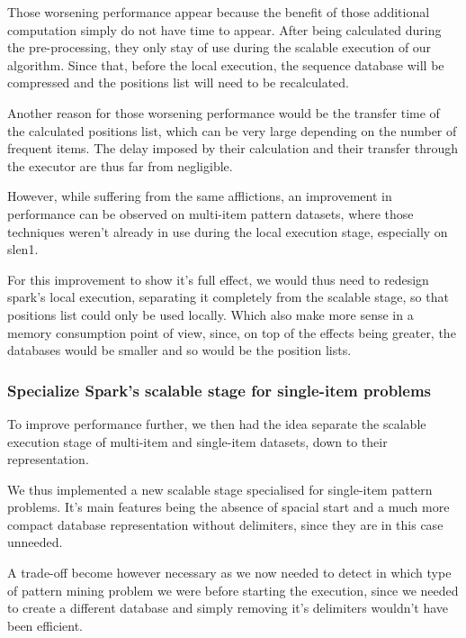 \documentclass{eplmastersthesis}
\begin{document}
Those worsening performance appear because the benefit of those additional computation simply do not have time to appear. After being calculated during the pre-processing, they only stay of use during the scalable execution of our algorithm. Since that, before the local execution, the sequence database will be compressed and the positions list will need to be recalculated. \newline

Another reason for those worsening performance would be the transfer time of the calculated positions list, which can be very large depending on the number of frequent items. The delay imposed by their calculation and their transfer through the executor are thus far from negligible. \newline

However, while suffering from the same afflictions, an improvement in performance can be observed on multi-item pattern datasets, where those techniques weren't already in use during the local execution stage, especially on slen1. \newline

For this improvement to show it's full effect, we would thus need to redesign spark's local execution, separating it completely from the scalable stage, so that positions list could only be used locally.
Which also make more sense in a memory consumption point of view, since, on top of the effects being greater, the databases would be smaller and so would be the position lists.

\subsubsection{Specialize Spark's scalable stage for single-item problems}

To improve performance further, we then had the idea separate the scalable execution stage of multi-item and single-item datasets, down to their representation. \newline

We thus implemented a new scalable stage specialised for single-item pattern problems. It's main features being the absence of spacial start and a much more compact database representation without delimiters, since they are in this case unneeded. \newline

A trade-off become however necessary as we now needed to detect in which type of pattern mining problem we were before starting the execution, since we needed to create a different database and simply removing it's delimiters wouldn't have been efficient. \newline
\end{document}
